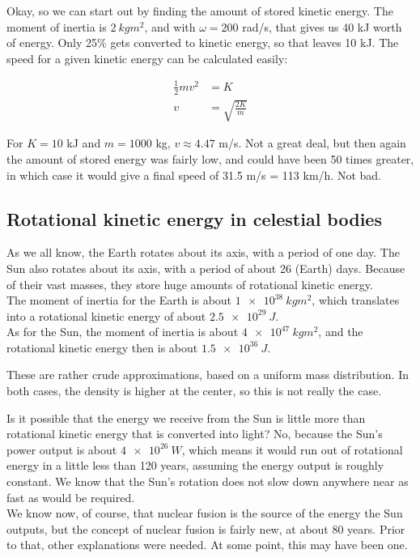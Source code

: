 \documentclass[8.01x]{subfiles}
\begin{document}
Okay, so we can start out by finding the amount of stored kinetic energy. The moment of inertia is $\SI{2}{kg m^2}$, and with $\omega = 200$ rad/s, that gives us 40 kJ worth of energy. Only 25\% gets converted to kinetic energy, so that leaves 10 kJ. The speed for a given kinetic energy can be calculated easily:

\begin{align}
\frac{1}{2} m v^2 &= K\\
v &= \sqrt{\frac{2 K}{m}}
\end{align}

For $K = 10$ kJ and $m = 1000$ kg, $v \approx 4.47$ m/s. Not a great deal, but then again the amount of stored energy was fairly low, and could have been 50 times greater, in which case it would give a final speed of 31.5 m/s = 113 km/h. Not bad.

\subsection{Rotational kinetic energy in celestial bodies}

As we all know, the Earth rotates about its axis, with a period of one day. The Sun also rotates about its axis, with a period of about 26 (Earth) days. Because of their vast masses, they store huge amounts of rotational kinetic energy.\\
The moment of inertia for the Earth is about $\SI{1e38}{kg m^2}$, which translates into a rotational kinetic energy of about $\SI{2.5e29}{J}$.\\
As for the Sun, the moment of inertia is about $\SI{4e47}{kg m^2}$, and the rotational kinetic energy then is about $\SI{1.5e36}{J}$.

These are rather crude approximations, based on a uniform mass distribution. In both cases, the density is higher at the center, so this is not really the case.

Is it possible that the energy we receive from the Sun is little more than rotational kinetic energy that is converted into light? No, because the Sun's power output is about $\SI{4e26}{W}$, which means it would run out of rotational energy in a little less than 120 years, assuming the energy output is roughly constant. We know that the Sun's rotation does not slow down anywhere near as fast as would be required.\\
We know now, of course, that nuclear fusion is the source of the energy the Sun outputs, but the concept of nuclear fusion is fairly new, at about 80 years. Prior to that, other explanations were needed. At some point, this may have been one.
\end{document}
